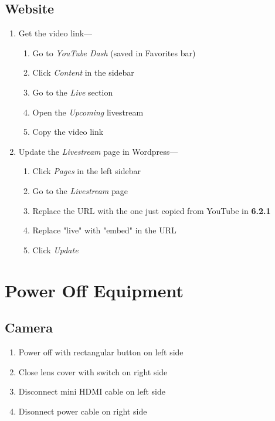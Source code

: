 \documentclass[12pt]{article}
\begin{document}
    \subsection{Website}
    \begin{enumerate}
        \item Get the video link---
        \begin{enumerate}
            \item Go to \emph{YouTube Dash} (saved in Favorites bar)
            \item Click \emph{Content} in the sidebar
            \item Go to the \emph{Live} section
            \item Open the \emph{Upcoming} livestream
            \item Copy the video link
        \end{enumerate}
        \item Update the \emph{Livestream} page in Wordpress---
        \begin{enumerate}
            \item Click \emph{Pages} in the left sidebar
            \item Go to the \emph{Livestream} page
            \item Replace the URL with the one just copied from YouTube in \textbf{6.2.1}
            \item Replace "live" with "embed" in the URL
            \item Click \emph{Update}
        \end{enumerate}
    \end{enumerate}


\section{Power Off Equipment}
    \subsection{Camera}
    \begin{enumerate}
        \item Power off with rectangular button on left side
        \item Close lens cover with switch on right side
        \item Disconnect mini HDMI cable on left side
        \item Disonnect power cable on right side
    \end{enumerate}
\end{document}
